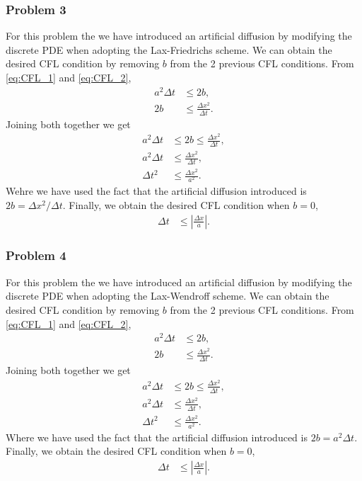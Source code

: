 \subsubsection*{Problem 3}
For this problem the we have introduced an artificial diffusion by modifying the discrete PDE when adopting the Lax-Friedrichs scheme. We can obtain the desired CFL condition by removing $b$ from the 2 previous CFL conditions. From \eqref{eq:CFL_1} and \eqref{eq:CFL_2},
\begin{align*}
a^2\Delta t&\leq 2b,\\
2b &\leq \frac{\Delta x^2}{\Delta t}.
\end{align*}
Joining both together we get
\begin{align*}
a^2\Delta t&\leq 2b\leq \frac{\Delta x^2}{\Delta t},\\
a^2\Delta t&\leq \frac{\Delta x^2}{\Delta t},\\
\Delta t^2&\leq \frac{\Delta x^2}{a^2}.
\end{align*}
Wehre we have used the fact that the artificial diffusion introduced is $2b = \Delta x^2/\Delta t$. Finally, we obtain the desired CFL condition when $b=0$,
\begin{align*}
\Delta t&\leq \left|\frac{\Delta x}{a}\right|.
\end{align*}

\subsubsection*{Problem 4}
For this problem the we have introduced an artificial diffusion by modifying the discrete PDE when adopting the Lax-Wendroff scheme. We can obtain the desired CFL condition by removing $b$ from the 2 previous CFL conditions. From \eqref{eq:CFL_1} and \eqref{eq:CFL_2},
\begin{align*}
a^2\Delta t&\leq 2b,\\
2b &\leq \frac{\Delta x^2}{\Delta t}.
\end{align*}
Joining both together we get
\begin{align*}
a^2\Delta t&\leq 2b\leq \frac{\Delta x^2}{\Delta t},\\
a^2\Delta t&\leq \frac{\Delta x^2}{\Delta t},\\
\Delta t^2&\leq \frac{\Delta x^2}{a^2}.
\end{align*}
Where we have used the fact that the artificial diffusion introduced is $2b = a^2\Delta t$. Finally, we obtain the desired CFL condition when $b=0$,
\begin{align*}
\Delta t&\leq \left|\frac{\Delta x}{a}\right|.
\end{align*}